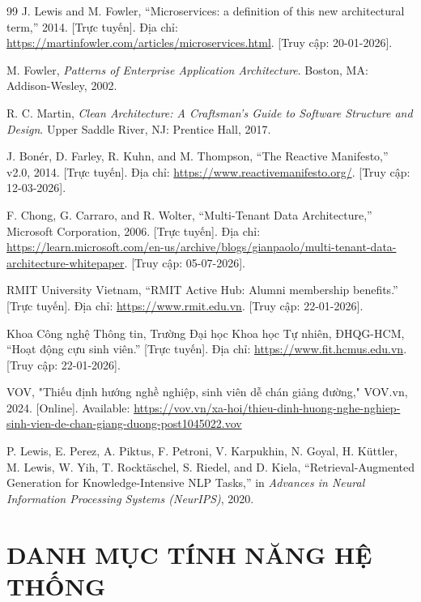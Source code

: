 \documentclass[12pt,a4paper,oneside]{report}
\begin{document}
\begin{thebibliography}{99}
 J. Lewis and M. Fowler, ``Microservices: a definition of this new architectural term,'' 2014. [Trực tuyến]. Địa chỉ: \url{https://martinfowler.com/articles/microservices.html}. [Truy cập: 20-01-2026].

 M. Fowler, \textit{Patterns of Enterprise Application Architecture}. Boston, MA: Addison-Wesley, 2002.

 R. C. Martin, \textit{Clean Architecture: A Craftsman's Guide to Software Structure and Design}. Upper Saddle River, NJ: Prentice Hall, 2017.

 J. Bonér, D. Farley, R. Kuhn, and M. Thompson, ``The Reactive Manifesto,'' v2.0, 2014. [Trực tuyến]. Địa chỉ: \url{https://www.reactivemanifesto.org/}. [Truy cập: 12-03-2026].

 F. Chong, G. Carraro, and R. Wolter, ``Multi-Tenant Data Architecture,'' Microsoft Corporation, 2006. [Trực tuyến]. Địa chỉ: \url{https://learn.microsoft.com/en-us/archive/blogs/gianpaolo/multi-tenant-data-architecture-whitepaper}. [Truy cập: 05-07-2026].

 RMIT University Vietnam, ``RMIT Active Hub: Alumni membership benefits.'' [Trực tuyến]. Địa chỉ: \url{https://www.rmit.edu.vn}. [Truy cập: 22-01-2026].

 Khoa Công nghệ Thông tin, Trường Đại học Khoa học Tự nhiên, ĐHQG-HCM, ``Hoạt động cựu sinh viên.'' [Trực tuyến]. Địa chỉ: \url{https://www.fit.hcmus.edu.vn}. [Truy cập: 22-01-2026].

 VOV, "Thiếu định hướng nghề nghiệp, sinh viên dễ chán giảng đường," VOV.vn, 2024. [Online]. Available: \url{https://vov.vn/xa-hoi/thieu-dinh-huong-nghe-nghiep-sinh-vien-de-chan-giang-duong-post1045022.vov}

 P. Lewis, E. Perez, A. Piktus, F. Petroni, V. Karpukhin, N. Goyal, H. Küttler, M. Lewis, W. Yih, T. Rocktäschel, S. Riedel, and D. Kiela, ``Retrieval-Augmented Generation for Knowledge-Intensive NLP Tasks,'' in \textit{Advances in Neural Information Processing Systems (NeurIPS)}, 2020.

\end{thebibliography}
\appendix
\chapter{DANH MỤC TÍNH NĂNG HỆ THỐNG}
\end{document}
